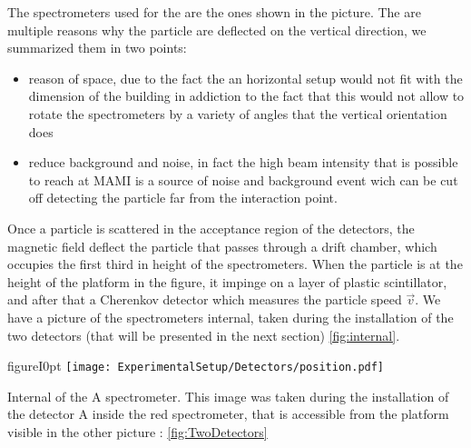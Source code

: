 The spectrometers used for the \transv are the ones shown in the picture. The are multiple reasons why the particle are deflected on the vertical direction, we summarized them in two points: 
\begin{itemize}
\item reason of space, due to the fact the an horizontal setup would not fit with the dimension of the building in addiction to the fact that this would not allow to rotate the spectrometers by a variety of angles that the vertical orientation does
\item reduce background and noise, in fact the high beam intensity that is possible to reach at MAMI is a source of noise and background event wich can be cut off detecting the particle far from the interaction point. 
\end{itemize}      

Once a particle is scattered in the acceptance region of the detectors, the magnetic field deflect the particle that passes through a drift chamber, which occupies the first third in height of the spectrometers. When the particle is at the height of the platform in the figure, it impinge on a layer of plastic scintillator, and after that a Cherenkov detector which measures the particle speed $\vec{v}$. We have a picture of the spectrometers internal, taken during the installation of the two detectors (that will be presented in the next section) \ref{fig:internal}.

\begin{wrapfloat}{figure}{I}{0pt}
\texttt{[image: ExperimentalSetup/Detectors/position.pdf]}
\caption{Internal of the A spectrometer. This image was taken during the installation of the detector A inside the red spectrometer, that is accessible from the platform visible in the other picture : \ref{fig:TwoDetectors}}
\label{fig:internal}
\end{wrapfloat}


